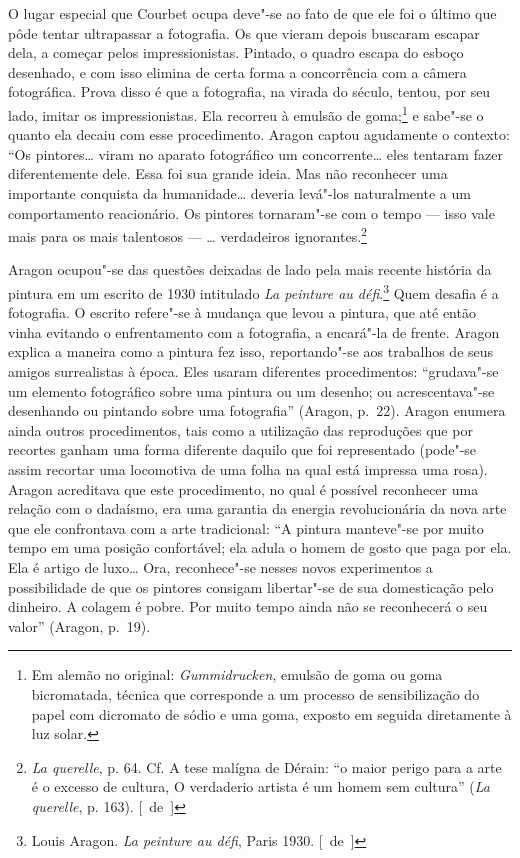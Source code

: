 O lugar especial que Courbet ocupa deve"-se ao fato de que ele foi o
último que pôde tentar ultrapassar a fotografia. Os que vieram depois buscaram
escapar dela, a começar pelos impressionistas. Pintado, o quadro escapa
do esboço desenhado, e com isso elimina de certa forma a
concorrência com a câmera fotográfica. Prova disso é que a fotografia, na
virada do século, tentou, por seu lado, imitar os impressionistas. Ela
recorreu à emulsão de goma;\footnote{Em alemão no original:
  \emph{Gummidrucken}, emulsão de goma ou goma bicromatada, técnica que
  corresponde a um processo de sensibilização do papel com dicromato de
  sódio e uma goma, exposto em seguida diretamente à luz solar. \versal{[N.~T.]}} e
sabe"-se o quanto ela decaiu com esse procedimento. Aragon captou
agudamente o contexto: ``Os pintores\ldots{} viram no aparato fotográfico um
concorrente\ldots{} eles tentaram fazer diferentemente dele. Essa foi sua
grande ideia. Mas não reconhecer uma importante conquista da humanidade\ldots{} deveria levá"-los naturalmente a um comportamento reacionário. Os
pintores tornaram"-se com o tempo --- isso vale mais para os mais
talentosos --- \ldots{} verdadeiros ignorantes.\footnote{\emph{La querelle}, p.
  64. Cf. A tese malígna de Dérain: ``o maior perigo para a arte é o
  excesso de cultura, O verdaderio artista é um homem sem cultura''
  (\emph{La querelle}, p. 163). [~de~]}

Aragon ocupou"-se das questões deixadas de lado pela mais recente história da
pintura em um escrito de 1930 intitulado \emph{La peinture au
défi}.\footnote{Louis Aragon. \emph{La peinture au défi}, Paris 1930. [~de~]}
Quem desafia é a fotografia. O escrito refere"-se à mudança que levou a
pintura, que até então vinha evitando o enfrentamento com a fotografia, a
encará"-la de frente. Aragon explica a maneira como a pintura fez isso,
reportando"-se aos trabalhos de seus amigos surrealistas à época. Eles usaram
diferentes procedimentos: ``grudava"-se um elemento fotográfico sobre uma
pintura ou um desenho; ou acrescentava"-se desenhando ou pintando sobre uma
fotografia'' (Aragon, p.~22). Aragon enumera ainda outros
procedimentos, tais como a utilização das reproduções que por recortes
ganham uma forma diferente daquilo que foi representado (pode"-se assim
recortar uma locomotiva de uma folha na qual está impressa uma rosa).
Aragon acreditava que este procedimento, no qual é possível reconhecer uma
relação com o dadaísmo, era uma garantia da energia revolucionária
da nova arte que ele confrontava com a arte tradicional: ``A pintura
manteve"-se por muito tempo em uma posição confortável; ela adula o homem de gosto
que paga por ela. Ela é artigo de luxo\ldots{} Ora,
reconhece"-se nesses novos experimentos a possibilidade de que os pintores
consigam libertar"-se de sua domesticação pelo dinheiro. A
colagem é pobre. Por muito tempo ainda não se reconhecerá o seu valor'' (Aragon, p.~19).

